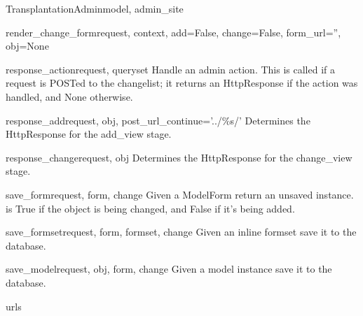 \documentclass[letterpaper,10pt,english]{sphinxmanual}
\begin{document}
\begin{classdesc}{TransplantationAdmin}{model, admin\_site}
\hypertarget{data.admin.TransplantationAdmin.render_change_form}{}\begin{methoddesc}{render\_change\_form}{request, context, add=False, change=False, form\_url='', obj=None}\end{methoddesc}

\hypertarget{data.admin.TransplantationAdmin.response_action}{}\begin{methoddesc}{response\_action}{request, queryset}
Handle an admin action. This is called if a request is POSTed to the
changelist; it returns an HttpResponse if the action was handled, and
None otherwise.
\end{methoddesc}

\hypertarget{data.admin.TransplantationAdmin.response_add}{}\begin{methoddesc}{response\_add}{request, obj, post\_url\_continue='../\%s/'}
Determines the HttpResponse for the add\_view stage.
\end{methoddesc}

\hypertarget{data.admin.TransplantationAdmin.response_change}{}\begin{methoddesc}{response\_change}{request, obj}
Determines the HttpResponse for the change\_view stage.
\end{methoddesc}

\hypertarget{data.admin.TransplantationAdmin.save_form}{}\begin{methoddesc}{save\_form}{request, form, change}
Given a ModelForm return an unsaved instance.  is True if
the object is being changed, and False if it's being added.
\end{methoddesc}

\hypertarget{data.admin.TransplantationAdmin.save_formset}{}\begin{methoddesc}{save\_formset}{request, form, formset, change}
Given an inline formset save it to the database.
\end{methoddesc}

\hypertarget{data.admin.TransplantationAdmin.save_model}{}\begin{methoddesc}{save\_model}{request, obj, form, change}
Given a model instance save it to the database.
\end{methoddesc}

\hypertarget{data.admin.TransplantationAdmin.urls}{}\begin{memberdesc}{urls}\end{memberdesc}
\end{classdesc}
\end{document}
